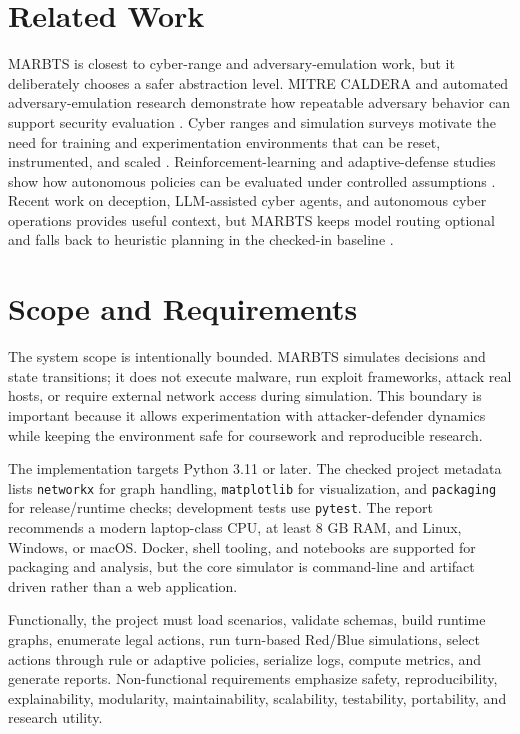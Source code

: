 \documentclass[10pt,twocolumn]{article}
\begin{document}
\section{Related Work}
MARBTS is closest to cyber-range and adversary-emulation work, but it deliberately chooses a safer abstraction level. MITRE CALDERA and automated adversary-emulation research demonstrate how repeatable adversary behavior can support security evaluation \cite{miller,caldera}. Cyber ranges and simulation surveys motivate the need for training and experimentation environments that can be reset, instrumented, and scaled \cite{priya,javadpour}. Reinforcement-learning and adaptive-defense studies show how autonomous policies can be evaluated under controlled assumptions \cite{wang,morozov}. Recent work on deception, LLM-assisted cyber agents, and autonomous cyber operations provides useful context, but MARBTS keeps model routing optional and falls back to heuristic planning in the checked-in baseline \cite{landolt,xie,soule}.

\section{Scope and Requirements}
The system scope is intentionally bounded. MARBTS simulates decisions and state transitions; it does not execute malware, run exploit frameworks, attack real hosts, or require external network access during simulation. This boundary is important because it allows experimentation with attacker-defender dynamics while keeping the environment safe for coursework and reproducible research.

The implementation targets Python 3.11 or later. The checked project metadata lists \texttt{networkx} for graph handling, \texttt{matplotlib} for visualization, and \texttt{packaging} for release/runtime checks; development tests use \texttt{pytest}. The report recommends a modern laptop-class CPU, at least 8 GB RAM, and Linux, Windows, or macOS. Docker, shell tooling, and notebooks are supported for packaging and analysis, but the core simulator is command-line and artifact driven rather than a web application.

Functionally, the project must load scenarios, validate schemas, build runtime graphs, enumerate legal actions, run turn-based Red/Blue simulations, select actions through rule or adaptive policies, serialize logs, compute metrics, and generate reports. Non-functional requirements emphasize safety, reproducibility, explainability, modularity, maintainability, scalability, testability, portability, and research utility.
\end{document}
